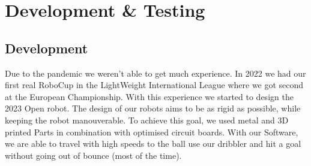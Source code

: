 \documentclass{scrartcl}
\begin{document}
\section{Development \& Testing}

\subsection{Development}
Due to the pandemic we weren't able to get much experience. In 2022 we had our first real RoboCup
in the LightWeight International League where we got second at the European Championship. With this experience we started to design the 2023 Open robot.
\newline
The design of our robots aims to be as rigid as possible, while keeping the robot manouverable.
To achieve this goal, we used metal and 3D printed Parts in combination with optimised circuit boards.
With our Software, we are able to travel with high speeds to the ball use our dribbler and
hit a goal without going out of bounce (most of the time).
\end{document}
